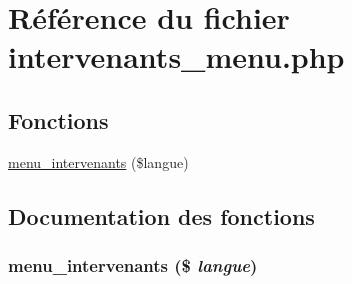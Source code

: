 \hypertarget{intervenants__menu_8php}{
\section{R\'{e}f\'{e}rence du fichier intervenants\_\-menu.php}
\label{intervenants__menu_8php}
}
\subsection*{Fonctions}
\begin{CompactItemize}
\item 
\hyperlink{intervenants__menu_8php_a0}{menu\_\-intervenants} (\$langue)
\end{CompactItemize}


\subsection{Documentation des fonctions}
\hypertarget{intervenants__menu_8php_a0}{
\subsubsection[menu\_\-intervenants]{\setlength{\rightskip}{0pt plus 5cm}menu\_\-intervenants (\$ {\em langue})}}
\label{intervenants__menu_8php_a0}



